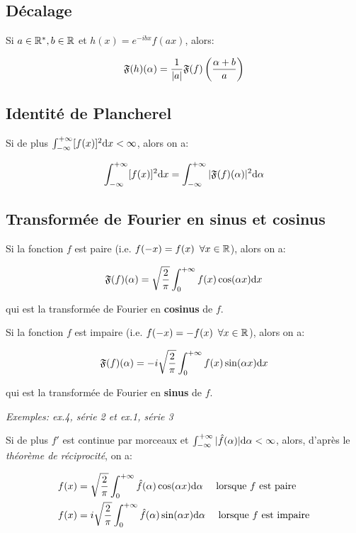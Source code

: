 \subsection{Décalage}

Si $a \in \mathbb{R}^*, b \in \mathbb{R}$ et $h(x) = e^{-ibx}f(ax)$, alors:

\[\mathfrak{F}(h)(\alpha) = \frac{1}{|a|} \mathfrak{F}(f)\left(\frac{\alpha + b}{a}\right)\]


\subsection{Identité de Plancherel}

Si de plus $\int_{-\infty}^{+\infty} [f(x)]^2 \mathrm{d}x < \infty$, alors on a:

\[\int_{-\infty}^{+\infty} [f(x)]^2 \mathrm{d}x = \int_{-\infty}^{+\infty} |\mathfrak{F}(f)(\alpha)|^2 \mathrm{d}\alpha\]


\subsection{Transformée de Fourier en sinus et cosinus}

Si la fonction $f$ est paire (i.e. $f(-x) = f(x) \enspace \forall x \in \mathbb{R}$), alors on a:

\[
\mathfrak{F}(f)(\alpha) =
\sqrt{\frac{2}{\pi}}
\int_{0}^{+\infty} f(x)\cos(\alpha x) \mathrm{d}x
\]

qui est la transformée de Fourier en \textbf{cosinus} de $f$.

Si la fonction $f$ est impaire (i.e. $f(-x) = -f(x) \enspace \forall x \in \mathbb{R}$), alors on a:

\[
\mathfrak{F}(f)(\alpha) =
- i
\sqrt{\frac{2}{\pi}}
\int_{0}^{+\infty} f(x)\sin(\alpha x) \mathrm{d}x
\]

qui est la transformée de Fourier en \textbf{sinus} de $f$.

\textit{Exemples: ex.4, série 2 et ex.1, série 3}

\begin{remark}
    Si de plus $f'$ est continue par morceaux et $\int_{-\infty}^{+\infty} |\hat{f}(\alpha)| \mathrm{d}\alpha < \infty$, alors, d'après le \textit{théorème de réciprocité}, on a:
    
    \begin{align*}
    f(x) &=
    \sqrt{\frac{2}{\pi}}
    \int_{0}^{+\infty} \hat{f}(\alpha)\cos(\alpha x) \mathrm{d}\alpha
    \quad
    \textrm{ lorsque } f \textrm{ est paire}\\
    f(x) &=
    i
    \sqrt{\frac{2}{\pi}}
    \int_{0}^{+\infty} \hat{f}(\alpha)\sin(\alpha x) \mathrm{d}\alpha
    \quad
    \textrm{ lorsque } f \textrm{ est impaire}\\
    \end{align*}
\end{remark}


